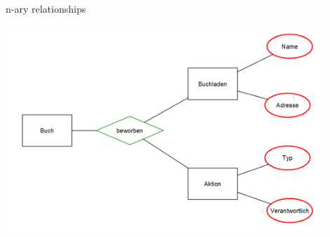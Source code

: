     
\begin{frame}{n-ary relationships}
\begin{center}
    \includegraphics[width=0.9\textwidth]{img/n-ary-relationship.png}
\end{center}    
\end{frame}

